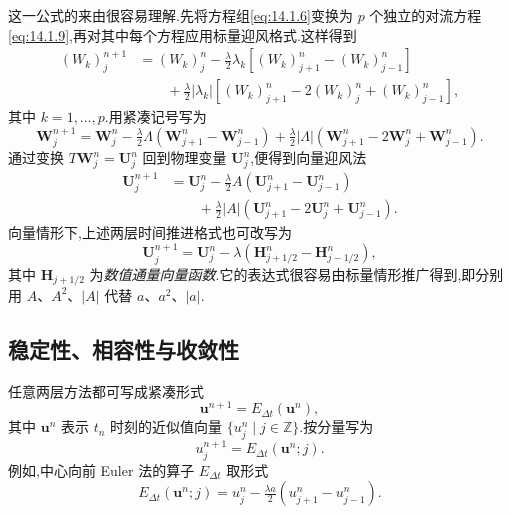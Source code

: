 这一公式的来由很容易理解.先将方程组\eqref{eq:14.1.6}变换为 \(p\) 个独立的对流方程\eqref{eq:14.1.9},再对其中每个方程应用标量迎风格式.这样得到
\[
  \begin{aligned}
    (W_k)_j^{n+1}&=(W_k)_j^n-\tfrac{\lambda}{2}\lambda_k
                       [(W_k)_{j+1}^n-(W_k)_{j-1}^n]\\
        &\qquad+\tfrac{\lambda}{2}|\lambda_k|
                  [(W_k)_{j+1}^n-2(W_k)_j^n+(W_k)_{j-1}^n],
  \end{aligned}
\]
其中 \(k=1,\ldots,p\).用紧凑记号写为
\[
  \boldsymbol{W}_j^{n+1}=\boldsymbol{W}_j^n-\tfrac{\lambda}{2}\Lambda(\boldsymbol{W}_{j+1}^n-\boldsymbol{W}_{j-1}^n)
     +\tfrac{\lambda}{2}|\Lambda|(\boldsymbol{W}_{j+1}^n-2\boldsymbol{W}_j^n+\boldsymbol{W}_{j-1}^n).
\]
通过变换 \(T\boldsymbol{W}_j^n=\boldsymbol{U}_j^n\) 回到物理变量 \(\boldsymbol{U}_j^n\),便得到向量迎风法
\begin{equation}\label{eq:14.2.6}
  \begin{aligned}
    \boldsymbol{U}_j^{n+1}
      &=\boldsymbol{U}_j^n-\tfrac{\lambda}{2}A(\boldsymbol{U}_{j+1}^n-\boldsymbol{U}_{j-1}^n)\\
      &\qquad+\tfrac{\lambda}{2}|A|(\boldsymbol{U}_{j+1}^n-2\boldsymbol{U}_j^n+\boldsymbol{U}_{j-1}^n).
  \end{aligned}
\end{equation}
向量情形下,上述两层时间推进格式也可改写为
\begin{equation}\label{eq:14.2.7}
  \boldsymbol{U}_j^{n+1}=\boldsymbol{U}_j^n
       -\lambda(\boldsymbol{H}_{j+1/2}^n-\boldsymbol{H}_{j-1/2}^n),
\end{equation}
其中 \(\boldsymbol{H}_{j+1/2}\) 为\emph{数值通量向量函数}.它的表达式很容易由标量情形推广得到,即分别用 \(A\)、\(A^2\)、\(|A|\) 代替 \(a\)、\(a^2\)、\(|a|\).

\subsection{稳定性、相容性与收敛性}\label{sec:14.2.2}

任意两层方法都可写成紧凑形式
\begin{equation}\label{eq:14.2.8}
  \boldsymbol{u}^{n+1}=E_{\Delta t}(\boldsymbol{u}^n),
\end{equation}
其中 \(\boldsymbol{u}^n\) 表示 \(t_n\) 时刻的近似值向量 \(\{u_j^n\mid j\in\mathbb Z\}\).按分量写为
\begin{equation}\label{eq:14.2.9}
  u_j^{n+1}=E_{\Delta t}(\boldsymbol{u}^n;j).
\end{equation}
例如,中心向前 Euler 法的算子 \(E_{\Delta t}\) 取形式
\begin{equation}\label{eq:14.2.10}
  E_{\Delta t}(\boldsymbol{u}^n;j)=u_j^n-\tfrac{\lambda a}{2}(u_{j+1}^n-u_{j-1}^n).
\end{equation}

